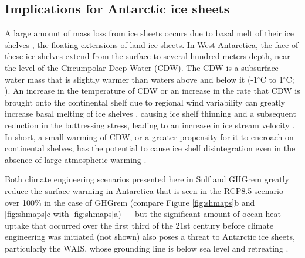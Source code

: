 \documentclass[draft,grl]{AGUTeX}  %
\begin{document}
\begin{article}
\section{Implications for Antarctic ice sheets}
A large amount of mass loss from ice sheets occurs due to basal melt of their ice shelves \citep{joughin11}, the floating extensions of land ice sheets. In West Antarctica, the face of these ice shelves extend from the surface to several hundred meters depth, near the level of the Circumpolar Deep Water (CDW). The CDW is a subsurface water mass that is slightly warmer than waters above and below it (-1$^\circ$C to 1$^\circ$C; \cite{yin11}). An increase in the temperature of CDW or an increase in the rate that CDW is brought onto the continental shelf due to regional wind variability can greatly increase basal melting of ice shelves \citep{thoma08,joughin11}, causing ice shelf thinning and a subsequent reduction in the buttressing stress, leading to an increase in ice stream velocity \citep{oppenheimer98}. In short, a small warming of CDW, or a greater propensity for it to encroach on continental shelves, has the potential to cause ice shelf disintegration even in the absence of large atmospheric warming \citep{oppenheimer98}. %

Both climate engineering scenarios presented here in Sulf and GHGrem greatly reduce the surface warming in Antarctica that is seen in the RCP8.5 scenario --- over 100\% in the case of GHGrem (compare Figure \ref{fig:shmaps}b and \ref{fig:shmaps}c with \ref{fig:shmaps}a) --- but the significant amount of ocean heat uptake that occurred over the first third of the 21st century before climate engineering was initiated (not shown) also poses a threat to Antarctic ice sheets, particularly the WAIS, whose grounding line is below sea level \citep{joughin11} and retreating \citep{rignot14}. %


\end{article}
\end{document}
